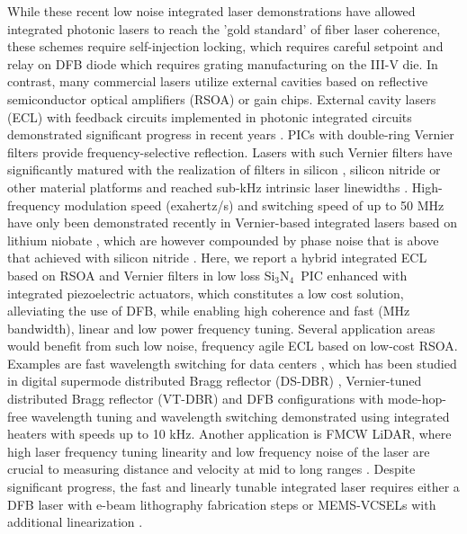 \documentclass[9pt,twocolumn,twoside, superscriptaddress]{revtex4-2}
\newcommand{\SiN}[0]{Si$_3$N$_4$~}
\begin{document}
While these recent low noise integrated laser demonstrations have allowed integrated photonic lasers to reach the 'gold standard' of fiber laser coherence, these schemes require self-injection locking, which requires careful setpoint and relay on DFB diode which requires grating manufacturing on the III-V die.
In contrast, many commercial lasers utilize external cavities based on reflective semiconductor optical amplifiers (RSOA) or gain chips. 
External cavity lasers (ECL) with feedback circuits implemented in photonic integrated circuits demonstrated significant progress in recent years \cite{Belt:14,Huang:19,duan2014hybrid,tran2019tutorial}.
PICs with double-ring Vernier filters provide frequency-selective reflection.
Lasers with such Vernier filters have significantly matured with the realization of filters in silicon \cite{Tran:2020,doi:10.1063/1.4915306}, silicon nitride \cite{photonics7010004} or other material platforms \cite{Radosavljevic:18,zhang2021integrated} and reached sub-kHz intrinsic laser linewidths \cite{fan2020hybrid,Tran:2020}.
High-frequency modulation speed (exahertz/s) and switching speed of up to 50 MHz have only been demonstrated recently in Vernier-based integrated lasers based on lithium niobate \cite{Li2022}, which are however compounded by phase noise that is above that achieved with silicon nitride \cite{fan2020hybrid}.
Here, we report a hybrid integrated ECL based on RSOA and Vernier filters in low loss \SiN PIC enhanced with integrated piezoelectric actuators, which constitutes a low cost solution, alleviating the use of DFB, while enabling high coherence and fast (MHz bandwidth), linear and low power frequency tuning.
Several application areas would benefit from such low noise, frequency agile ECL based on low-cost RSOA. Examples are fast wavelength switching for data centers \cite{guan2018widely}, which has been studied in digital supermode distributed Bragg reflector (DS-DBR) \cite{Yoo:17}, Vernier-tuned distributed Bragg reflector (VT-DBR) \cite{9563804} and DFB \cite{ueno2015fast} configurations with mode-hop-free wavelength tuning \cite{vanRees:20} and wavelength switching \cite{srinivasan2015coupled,li2018tunable} demonstrated using integrated heaters with speeds up to 10 kHz.
Another application is FMCW LiDAR, where high laser frequency tuning linearity and low frequency noise of the laser are crucial to measuring distance and velocity at mid to long ranges \cite{Harris:98,Behroozpour:17}.
Despite significant progress, the fast and linearly tunable integrated laser requires either a DFB laser \cite{dilazaro2018large} with e-beam lithography fabrication steps or MEMS-VCSELs with additional linearization \cite{Okano:20,Feneyrou:17}. 
\end{document}
